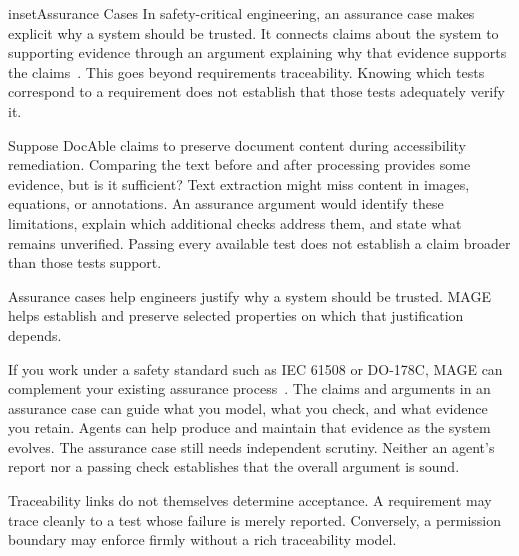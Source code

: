 \begin{bookbox}{inset}{Assurance Cases}
\label{inset-assurance-cases}
In safety-critical engineering, an assurance case makes explicit why a system should be trusted. It connects claims about the system to supporting evidence through an argument explaining why that evidence supports the claims~\citep{iso15026-2-2022,kelly2004gsn}. This goes beyond requirements traceability. Knowing which tests correspond to a requirement does not establish that those tests adequately verify it.

Suppose DocAble claims to preserve document content during accessibility remediation. Comparing the text before and after processing provides some evidence, but is it sufficient? Text extraction might miss content in images, equations, or annotations. An assurance argument would identify these limitations, explain which additional checks address them, and state what remains unverified. Passing every available test does not establish a claim broader than those tests support.

Assurance cases help engineers justify why a system should be trusted. MAGE helps establish and preserve selected properties on which that justification depends.

If you work under a safety standard such as IEC 61508 or DO-178C, MAGE can complement your existing assurance process~\citep{iec61508-1-2010,rtca-do178c-2011}. The claims and arguments in an assurance case can guide what you model, what you check, and what evidence you retain. Agents can help produce and maintain that evidence as the system evolves. The assurance case still needs independent scrutiny. Neither an agent's report nor a passing check establishes that the overall argument is sound.
\end{bookbox}


Traceability links do not themselves determine acceptance. A requirement may trace cleanly to a test whose failure is merely reported. Conversely, a permission boundary may enforce firmly without a rich traceability model.

